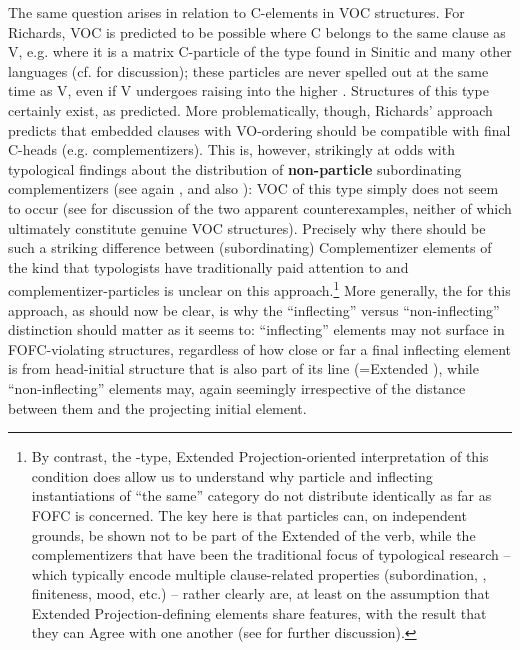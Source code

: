 \documentclass[output=paper]{LSP/langsci}
\begin{document}
The same {question} arises in relation to C-elements in VOC structures. For Richards, VOC is predicted to be possible where C belongs to the same clause as V, e.g. where it is a matrix C-particle of the type found in Sinitic and many other languages (cf. \citealt{Biberauer2017optionalv2} for discussion); these particles are never spelled out at the same time as V, even if V undergoes raising into the higher . Structures of this type certainly exist, as predicted. More problematically, though, Richards’ approach predicts that embedded clauses with VO-ordering should be compatible with final C-heads (e.g. complementizers). This is, however, strikingly at odds with typological findings about the distribution of \textbf{non-particle} subordinating complementizers (see again \citealt{Dryer2009}, and also \citealt{Biberauer2017optionalv2}): VOC of this type simply does not seem to occur (see \citealt{Biberauer2017optionalv2} for discussion of the two apparent counterexamples, neither of which ultimately constitute genuine VOC structures). Precisely why there should be such a striking difference between (subordinating) Complementizer elements of the kind that typologists have traditionally paid attention to and complementizer-particles is unclear on this approach.\footnote{By contrast, the -type, Extended Projection-oriented interpretation of this condition does allow us to understand why particle and inflecting instantiations of “the same” category do not distribute identically as far as FOFC is concerned. The key here is that particles can, on independent grounds, be shown not to be part of the Extended  of the verb, while the complementizers that have been the traditional focus of typological research – which typically encode multiple clause-related properties (subordination, , finiteness, mood, etc.) – rather clearly are, at least on the assumption that Extended Projection-defining elements share features, with the result that they can Agree with one another (see \citealt{Biberauer2017optionalv2} for further discussion).} More generally, the  for this approach, as should now be clear, is why the “inflecting” versus “non-inflecting” distinction should matter as it seems to: “inflecting” elements may not surface in FOFC-violating structures, regardless of how close or far a final inflecting element is from head-initial structure that is also part of its  line (=Extended ), while “non-inflecting” elements may, again seemingly irrespective of the distance between them and the projecting initial element.
\end{document}
